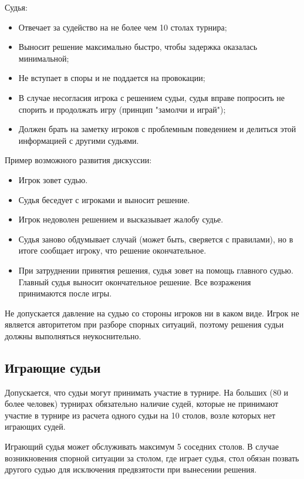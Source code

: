 Судья:
\begin{itemize}
	\item Отвечает за судейство на не более чем 10 столах турнира;
	\item Выносит решение максимально быстро, чтобы задержка оказалась минимальной;
	\item Не вступает в споры и не поддается на провокации;
	\item В случае несогласия игрока с решением судьи, судья вправе попросить не спорить и продолжать игру (принцип "замолчи и играй");
	\item Должен брать на заметку игроков с проблемным поведением и делиться этой информацией с другими судьями.
\end{itemize}

Пример возможного развития дискуссии:
\begin{itemize}
	\item Игрок зовет судью.
	\item Судья беседует с игроками и выносит решение.
	\item Игрок недоволен решением и высказывает жалобу судье.
	\item Судья заново обдумывает случай (может быть, сверяется с правилами), но в итоге сообщает игроку, что решение окончательное.
	\item При затруднении принятия решения, судья зовет на помощь главного судью. Главный судья выносит окончательное решение. Все возражения принимаются после игры. 
\end{itemize}

Не допускается давление на судью со стороны игроков ни в каком виде. Игрок не является авторитетом при разборе спорных ситуаций, поэтому решения судьи должны выполняться неукоснительно.

\subsection{Играющие судьи}

Допускается, что судьи могут принимать участие в турнире. На больших (80 и более человек) турнирах обязательно наличие судей, которые не принимают участие в турнире из расчета одного судьи на 10 столов, возле которых нет играющих судей.

Играющий судья может обслуживать максимум 5 соседних столов. В случае возникновения спорной ситуации за столом, где играет судья, стол обязан позвать другого судью для исключения предвзятости при вынесении решения. 

